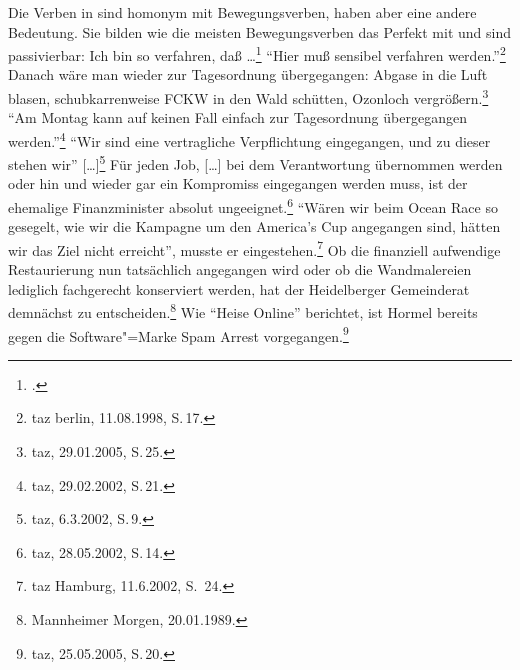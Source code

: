 \noindent
Die Verben in  sind homonym mit
Bewegungsverben, haben aber eine andere Bedeutung. Sie bilden wie die meisten Bewegungsverben
das Perfekt mit \sein und sind passivierbar:
\eal
\ex{}
Ich bin so verfahren, daß \ldots\footnote{
        .%
}
\ex 
"`Hier muß sensibel verfahren werden."'\footnote{
        taz berlin, 11.08.1998, S.\,17.%
}
\zl
\eal
\ex Danach wäre man wieder zur Tagesordnung übergegangen: Abgase in die Luft blasen, schubkarrenweise FCKW in den Wald schütten, Ozonloch vergrößern.\footnote{
  taz, 29.01.2005, S.\,25.
}
\ex "`Am Montag kann auf keinen Fall einfach zur Tagesordnung übergegangen werden."'\footnote{
        taz, 29.02.2002, S.\,21.
}
\zl
\eal
\label{bsp-eingegangen-all}
\ex{}
"`Wir sind eine vertragliche Verpflichtung eingegangen, und zu dieser stehen wir"' [\ldots]\footnote{
        taz, 6.3.2002, S.\,9.%
}
\ex\label{bsp-eingegangen}
Für jeden Job, [\ldots] bei dem Verantwortung übernommen werden oder hin und wieder gar
    ein Kompromiss eingegangen werden muss, ist der ehemalige Finanzminister absolut ungeeignet.\footnote{
        taz, 28.05.2002, S.\,14.%
    }
%
\zl
\eal
\label{bsp-angegangen-all}
\ex{}
"`Wären wir beim Ocean Race so gesegelt, wie wir die Kampagne um den America's Cup angegangen sind, 
hätten wir das Ziel nicht erreicht"', musste er eingestehen.\footnote{
        taz Hamburg, 11.6.2002, S.\, 24.%
}
%
\ex\label{bsp-angegangen}
Ob die finanziell
aufwendige Restaurierung nun tatsächlich angegangen wird oder ob die Wandmalereien lediglich fachgerecht konserviert werden, hat der
Heidelberger Gemeinderat demnächst zu entscheiden.\footnote{
        Mannheimer Morgen, 20.01.1989.%
}
\zl
\eal
\ex Wie "`Heise Online"' berichtet, ist Hormel bereits gegen die Software"=Marke Spam Arrest vorgegangen.\footnote{
  taz, 25.05.2005, S.\,20.%
}
